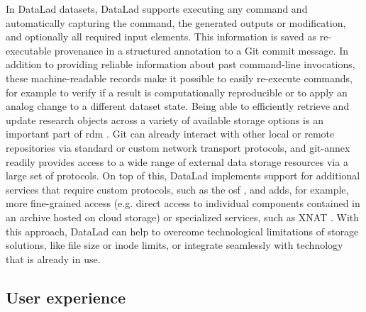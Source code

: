 {In DataLad datasets, DataLad supports executing any command and automatically capturing the command, the generated outputs or modification, and optionally all required input elements.
This information is saved as re-executable provenance in a structured annotation to a Git commit message.
In addition to providing reliable information about past command-line invocations, these machine-readable records make it possible to easily re-execute commands, for example to verify if a result is computationally reproducible or to apply an analog change to a different dataset state.
Being able to efficiently retrieve and update research objects across a variety of available storage options is an important part of \gls{rdm} \citep{borghi2018data}.
Git can already interact with other local or remote repositories via standard or custom network transport protocols, and git-annex readily provides access to a wide range of external data storage resources via a large set of protocols.
On top of this, DataLad implements support for additional services that require custom protocols, such as the \gls{osf} \citep{hanke2021dlosf}, and adds, for example, more fine-grained access (e.g. direct access to individual components contained in an archive hosted on cloud storage) or specialized services, such as XNAT \citep[\url{www.xnat.org},][]{halchenko2021xnat}.
With this approach, DataLad can help to overcome technological limitations of storage solutions, like file size or inode limits, or integrate seamlessly with technology that is already in use.



\subsection{User experience}

}
